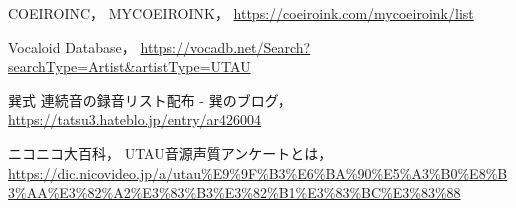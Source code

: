 \documentclass[a4j,8pt,twocolumn]{extarticle}
\begin{document}
\begin{thebibliography}{9}
COEIROINC，
MYCOEIROINK，
\url{https://coeiroink.com/mycoeiroink/list}

Vocaloid Database，
\url{https://vocadb.net/Search?searchType=Artist&artistType=UTAU}

巽式 連続音の録音リスト配布 - 巽のブログ，
\url{https://tatsu3.hateblo.jp/entry/ar426004}

ニコニコ大百科，
UTAU音源声質アンケートとは，
\url{https://dic.nicovideo.jp/a/utau%E9%9F%B3%E6%BA%90%E5%A3%B0%E8%B3%AA%E3%82%A2%E3%83%B3%E3%82%B1%E3%83%BC%E3%83%88}

\end{thebibliography}


\end{document}

